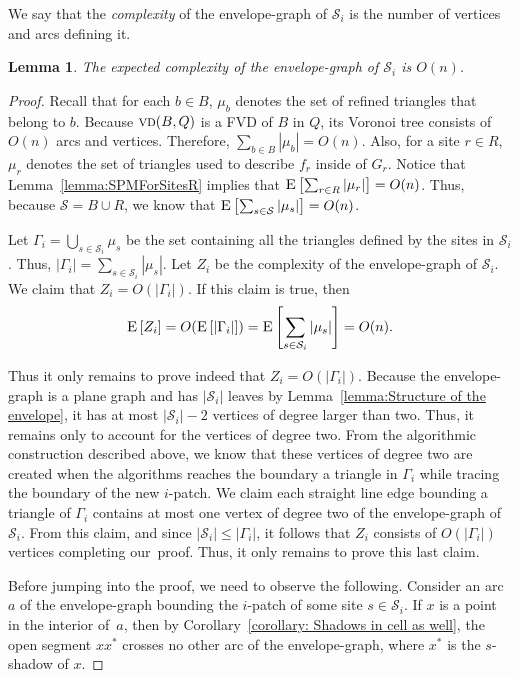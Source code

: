 \documentclass[a4paper, 11pt]{article}
\newtheorem{lemma}[theorem]{Lemma}
\newcommand{\icell}[1][i]{${#1}$-patch\xspace}
\newcommand{\s}{\mathcal S}
\newcommand{\vd}[2][P]{\textsc{vd}(#2, #1)}
\newcommand{\ex}[1]{\textsc{E}\left[#1\right]}
\begin{document}
We say that the \emph{complexity} of the envelope-graph of $\s_i$ is the number of vertices and arcs defining it.

\begin{lemma}\label{lemma: Complexity of envelope-graph}
The expected complexity of the envelope-graph of $\s_i$ is $O(n)$.
\end{lemma}
\begin{proof}
Recall that for each $b\in B$, $\mu_b$ denotes the set of refined triangles that belong to $b$. 
Because $\vd[Q]{B}$ is a FVD of $B$ in $Q$, its Voronoi tree consists of $O(n)$ arcs and vertices.
Therefore, $\sum_{b\in B} |\mu_b| = O(n)$.
Also, for a site $r\in R$, $\mu_r$ denotes the set of triangles used to describe $f_r$ inside of $G_r$.
Notice that Lemma~\ref{lemma:SPMForSitesR} implies that  $\ex{\sum_{r\in R} |\mu_r|}= O(n)$.
Thus, because $\s = B\cup R$, we know that  $\ex{\sum_{s\in \s} |\mu_s|} = O(n)$.

Let $\Gamma_i = \bigcup_{s\in \s_i} \mu_s$ be the set containing all the triangles defined by the sites in $\s_i$.
Thus, $|\Gamma_i| = \sum_{s\in \s_i}|\mu_s|$.
Let $Z_i$ be the complexity of the envelope-graph of $\s_i$. 
We claim that $Z_i= O(|\Gamma_i|)$. If this claim is true, then 
\[ \ex{Z_i} = O(\ex{|\Gamma_i|})= \ex{\sum_{s\in \s_i} |\mu_s|} = O(n). \]

Thus it only remains to prove indeed that $Z_i= O(|\Gamma_i|)$.
Because the envelope-graph is a plane graph and has $|\s_i|$ leaves by Lemma~\ref{lemma:Structure of the envelope}, it has at most $|\s_i| - 2$ vertices of degree larger than two.
Thus, it remains only to account for the vertices of degree two.
From the algorithmic construction described above,
we know that these vertices of degree two are created when the algorithms reaches the boundary a triangle in $\Gamma_i$ while tracing the boundary of the new \icell. 
We claim each straight line edge bounding a triangle of $\Gamma_i$ contains at most one vertex of degree two of the envelope-graph of $\s_i$.
From this claim, and since $|\s_i|\leq |\Gamma_i|$, it follows that  $Z_i$ consists of $O(|\Gamma_i|)$ vertices completing our~proof.
Thus, it only remains to prove this last claim.

Before jumping into the proof, we need to observe the following.
Consider an arc $a$ of the envelope-graph bounding the \icell of some site $s\in \s_i$.
If $x$ is a point in the interior of~$a$, then by Corollary~\ref{corollary: Shadows in cell as well}, 
the open segment $x x^*$ crosses no other arc of the envelope-graph, where $x^*$ is the $s$-shadow of $x$.


\end{proof}
\end{document}
